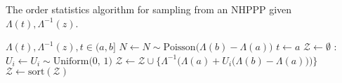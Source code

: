 \begin{algorithm}[h!]
\caption{The order statistics algorithm for sampling from an NHPPP given $\Lambda(t), \Lambda^{-1}(z)$.}\label{alg:NHPPP_order_stats}
\begin{algorithmic}[1]
\Require $\Lambda(t), \Lambda^{-1}(z), t \in (a, b]$ 
\State $N \gets N \sim \textrm{Poisson}\big(\Lambda(b)-\Lambda(a)\big)$
\State $t \gets a$
\State $\mathcal{Z} \gets \emptyset$ 
    :
        \State $U_i \gets U_i \sim \textrm{Uniform(0, 1)}$ 
        \State $\mathcal{Z} \gets \mathcal{Z} \cup \{ \Lambda^{-1} \Big( \Lambda(a) + U_i \big( \Lambda(b) - \Lambda(a) \big)\Big) \} $ 
    \EndFor
    \State $\mathcal{Z} \gets \textrm{sort}(\mathcal{Z})$ 
\EndIf
\State
{} 
\end{algorithmic}
\end{algorithm}

